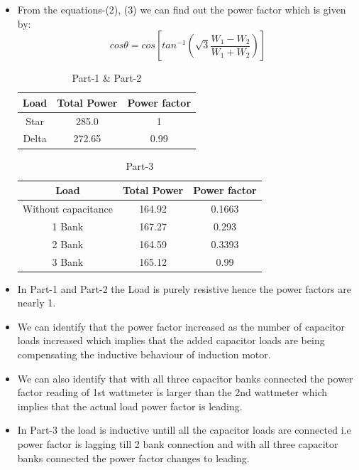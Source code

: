 \documentclass[12pt]{article}
\begin{document}
    \begin{itemize}
        \item From the equations-(2), (3) we can find out the power factor which is given by: 
        \begin{equation}
            cos\theta = cos\left[tan^{-1}\left(\sqrt{3}\frac{W_1 - W_2}{W_1 + W_2}\right)\right] 
        \end{equation}
        
            \begin{table}[H]
                \centering
                \begin{tabular}{|c|c|c|}
                    \hline
                    Load & Total Power & Power factor  \\ \hline
                    Star & 285.0 & 1 \\ \hline
                    Delta & 272.65 & 0.99 \\ \hline
                \end{tabular}
                \caption{Part-1 \& Part-2}
            \end{table}
            
            \begin{table}[H]
                \centering
                \begin{tabular}{|c|c|c|}
                    \hline
                    Load & Total Power & Power factor  \\ \hline
                    Without capacitance  & 164.92 & 0.1663 \\ \hline
                    1 Bank & 167.27 & 0.293 \\ \hline
                    2 Bank & 164.59 & 0.3393 \\ \hline
                    3 Bank & 165.12 & 0.99 \\ \hline
                \end{tabular}
                \caption{Part-3}
            \end{table}
        \item In Part-1 and Part-2 the Load is purely resistive hence the power factors are nearly 1.
        \item We can identify that the power factor increased as the number of capacitor loads increased which implies that the added capacitor loads are being compensating the inductive behaviour of induction motor.
        \item We can also identify that with all three capacitor banks connected the power factor reading of 1st wattmeter is larger than the 2nd wattmeter which implies that the actual load power factor is leading.
        \item In Part-3 the load is inductive untill all the capacitor loads are connected i.e power factor is lagging till 2 bank connection and with all three capacitor banks connected the power factor changes to leading.
        
    \end{itemize}
  
\end{document}
